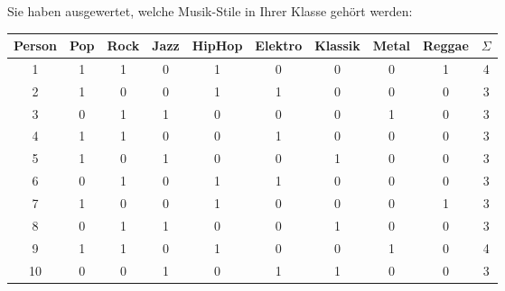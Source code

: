 \begin{myexercise}
    Sie haben ausgewertet, welche Musik-Stile in Ihrer Klasse gehört werden:
    \begin{table}[H]
        \centering
        \begin{tabular}{cccccccccc}
            \textbf{Person} & \textbf{Pop} & \textbf{Rock} & \textbf{Jazz} & \textbf{HipHop} & \textbf{Elektro} & \textbf{Klassik} & \textbf{Metal} & \textbf{Reggae} & $\Sigma$ \\
            \midrule
            1               & 1            & 1             & 0             & 1               & 0                & 0                & 0              & 1               & 4        \\
            2               & 1            & 0             & 0             & 1               & 1                & 0                & 0              & 0               & 3        \\
            3               & 0            & 1             & 1             & 0               & 0                & 0                & 1              & 0               & 3        \\
            4               & 1            & 1             & 0             & 0               & 1                & 0                & 0              & 0               & 3        \\
            5               & 1            & 0             & 1             & 0               & 0                & 1                & 0              & 0               & 3        \\
            6               & 0            & 1             & 0             & 1               & 1                & 0                & 0              & 0               & 3        \\
            7               & 1            & 0             & 0             & 1               & 0                & 0                & 0              & 1               & 3        \\
            8               & 0            & 1             & 1             & 0               & 0                & 1                & 0              & 0               & 3        \\
            9               & 1            & 1             & 0             & 1               & 0                & 0                & 1              & 0               & 4        \\
            10              & 0            & 0             & 1             & 0               & 1                & 1                & 0              & 0               & 3        \\

\end{tabular}
\end{table}
\end{myexercise}
